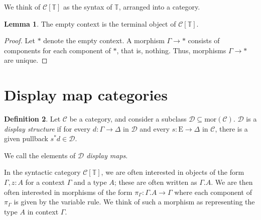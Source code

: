 \documentclass{article}
\theoremstyle{definition}
\newtheorem{definition}{Definition}[section]
\newtheorem{lemma}[definition]{Lemma}
\newcommand{\T}{\mathbb T}
\newcommand{\C}{\mathcal C}
\newcommand{\D}{\mathcal D}
\newcommand{\syncat}[1]{\C [#1]}
\newcommand{\Epsilon}{\mathrm E}
\newcommand{\mor}{\mathrm {mor}}
\begin{document}
We think of $\syncat{\T}$ as the syntax of $\T$, arranged into a category.

\begin{lemma}
    The empty context is the terminal object of $\syncat{\T}$.
\end{lemma}
\begin{proof}
    Let $*$ denote the empty context. A morphism $\Gamma \to *$ consists of components for each component of $*$, that is, nothing. Thus, morphisms $\Gamma \to *$ are unique.
\end{proof}

\section{Display map categories}

\begin{definition}
    Let $\C$ be a category, and consider a subclass $\D \subseteq \mor (\C)$. $\D$ is a \emph{display structure} \cite{taylor} if for every $d : \Gamma \to \Delta$ in $\D$ and every $s: \Epsilon \to \Delta$ in $\C$, there is a given pullback $s^* d \in \D$.

    We call the elements of $\D$ \emph{display maps}.
\end{definition}

In the syntactic category $\syncat{\T}$, we are often interested in objects of the form $\Gamma, z: A$ for a context $\Gamma$ and a type $A$; these are often written as $\Gamma.A$. We are then often interested in morphisms of the form $\pi_\Gamma : \Gamma.A \to \Gamma$ where each component of $\pi_\Gamma$ is given by the variable rule. We think of such a morphism as representing the type $A$ in context $\Gamma$.
\end{document}
